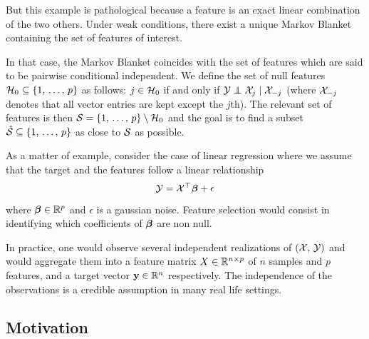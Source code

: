 But this example is pathological because a feature is an exact linear combination of the two others.
Under weak conditions, there exist a unique Markov Blanket containing the set of features of interest.
\begin{remark}
    In that case, the Markov Blanket coincides with the set of features
    which are said to be pairwise conditional independent.
    We define the set of null features $\mathcal{H}_0 \subseteq \left\{ 1,\, \dots,\, p \right\}$ as follows:
    $j \in \mathcal{H}_0$ if and only if $\cY \independent \cX_j \mid \cX_{-j}$
    (where $\mathcal{X}_{-j}$ denotes that all vector entries are kept except the $j$th).
    The relevant set of features is then $\mathcal{S} = \left\{ 1,\, \dots,\, p \right\} \setminus \mathcal{H}_0$
    and the goal is to find a subset $\hat{\mathcal{S}} \subseteq \left\{ 1,\, \dots,\, p \right\}$ as close to $\mathcal{S}$ as possible.
\end{remark}
As a matter of example,
consider the case of linear regression where we assume that the target and the features follow a linear relationship
\begin{equation*}
    \mathcal{Y} = \mathcal{X}^\top \bm{\beta} + \epsilon
\end{equation*}
where $\bm{\beta} \in \mathbb{R}^p$ and $\epsilon$ is a gaussian noise.
Feature selection would consist in identifying which coefficients of $\bm{\beta}$ are non null.

In practice, one would observe several independent realizations of
$\left( \mathcal{X},\, \mathcal{Y} \right)$ and would aggregate them into a feature matrix
$X \in \mathbb{R}^{n \times p}$ of $n$ samples and $p$ features, and a target vector $\mathbf{y} \in \mathbb{R}^n$ respectively.
The independence of the observations is a credible assumption in many real life settings.

\subsection{Motivation}\label{subsec:fs_motivation}

